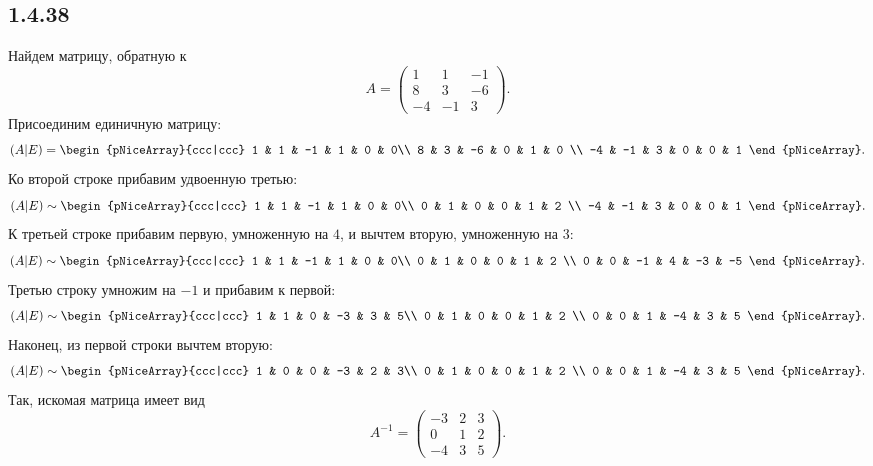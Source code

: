 \subsection{1.4.38}

Найдем матрицу, обратную к
\[
A=
\begin{pmatrix}
	1 & 1 & -1 \\
	8 & 3 & -6 \\
	-4 & -1 & 3
\end{pmatrix}
.
\]
Присоединим единичную матрицу:
\[
(A|E)=
\begin{pNiceArray}{ccc|ccc}
	1 & 1 & -1 & 1 & 0 & 0\\
	8 & 3 & -6 & 0 & 1 & 0 \\
	-4 & -1 & 3 & 0 & 0 & 1
\end{pNiceArray}.
\]
Ко второй строке прибавим удвоенную третью:
\[
(A|E)\sim
\begin{pNiceArray}{ccc|ccc}
	1 & 1 & -1 & 1 & 0 & 0\\
	0 & 1 & 0 & 0 & 1 & 2 \\
	-4 & -1 & 3 & 0 & 0 & 1
\end{pNiceArray}.
\]
К третьей строке прибавим первую, умноженную на $4$, и вычтем вторую, умноженную на $3$:
\[
(A|E)\sim
\begin{pNiceArray}{ccc|ccc}
	1 & 1 & -1 & 1 & 0 & 0\\
	0 & 1 & 0 & 0 & 1 & 2 \\
	0 & 0 & -1 & 4 & -3 & -5
\end{pNiceArray}.
\]
Третью строку умножим на $-1$ и прибавим к первой:
\[
(A|E)\sim
\begin{pNiceArray}{ccc|ccc}
	1 & 1 & 0 & -3 & 3 & 5\\
	0 & 1 & 0 & 0 & 1 & 2 \\
	0 & 0 & 1 & -4 & 3 & 5
\end{pNiceArray}.
\]
Наконец, из первой строки вычтем вторую:
\[
(A|E)\sim
\begin{pNiceArray}{ccc|ccc}
	1 & 0 & 0 & -3 & 2 & 3\\
	0 & 1 & 0 & 0 & 1 & 2 \\
	0 & 0 & 1 & -4 & 3 & 5
\end{pNiceArray}.
\]
Так, искомая матрица имеет вид
\[
A^{-1}=
\begin{pmatrix}
	-3 & 2 & 3\\
	0 & 1 & 2 \\
	-4 & 3 & 5
\end{pmatrix}.
\]